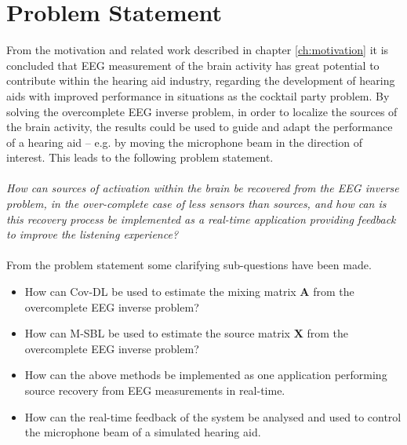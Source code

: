\chapter{Problem Statement}\label{ch:problemstatement}
From the motivation and related work described in chapter \ref{ch:motivation} it is concluded that EEG measurement of the brain activity has great potential to contribute within the hearing aid industry, regarding the development of hearing aids with improved performance in situations as the cocktail party problem. 
By solving the overcomplete EEG inverse problem, in order to localize the sources of the brain activity, the results could be used to guide and adapt the performance of a hearing aid -- e.g. by moving the microphone beam in the direction of interest. 
This leads to the following problem statement.
\\ \\
\textit{How can sources of activation within the brain be recovered from the EEG inverse problem, in the over-complete case of less sensors than sources, and how can is this recovery process be implemented as a real-time application providing feedback to improve the listening experience?}
\\ \\
From the problem statement some clarifying sub-questions have been made.
\begin{itemize}
\item How can Cov-DL be used to estimate the mixing matrix $\mathbf{A}$ from the overcomplete EEG inverse problem?
\item How can M-SBL be used to estimate the source matrix $\mathbf{X}$ from the overcomplete EEG inverse problem?
\item How can the above methods be implemented as one application performing source recovery from EEG measurements in real-time. 
\item How can the real-time feedback of the system be analysed and used to control the microphone beam of a simulated hearing aid. 
\end{itemize}

 